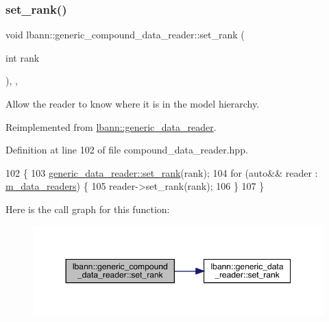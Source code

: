 \subsubsection{\texorpdfstring{set\+\_\+rank()}{set\_rank()}}
{\footnotesize\ttfamily void lbann\+::generic\+\_\+compound\+\_\+data\+\_\+reader\+::set\+\_\+rank (\begin{DoxyParamCaption}\item[{int}]{rank }\end{DoxyParamCaption})\hspace{0.3cm}{\ttfamily [inline]}, {\ttfamily [override]}, {\ttfamily [virtual]}}



Allow the reader to know where it is in the model hierarchy. 



Reimplemented from \hyperlink{classlbann_1_1generic__data__reader_a8515fb4ffbeaa89fd8459b66b9ba358f}{lbann\+::generic\+\_\+data\+\_\+reader}.



Definition at line 102 of file compound\+\_\+data\+\_\+reader.\+hpp.


\begin{DoxyCode}
102                                    \{
103     \hyperlink{classlbann_1_1generic__data__reader_a8515fb4ffbeaa89fd8459b66b9ba358f}{generic\_data\_reader::set\_rank}(rank);
104     \textcolor{keywordflow}{for} (\textcolor{keyword}{auto}&& reader : \hyperlink{classlbann_1_1generic__compound__data__reader_a9815e94ade5873415fd766e09d956d5b}{m\_data\_readers}) \{
105       reader->set\_rank(rank);
106     \}
107   \}
\end{DoxyCode}
Here is the call graph for this function\+:\nopagebreak
\begin{figure}[H]
\begin{center}
\leavevmode
\includegraphics[width=350pt]{classlbann_1_1generic__compound__data__reader_a85860f9ae7e38ae98421219e41b5f829_cgraph}
\end{center}
\end{figure}
\mbox{\label{classlbann_1_1generic__compound__data__reader_a19302078a484337e86b1549b48ef13ad}} 
